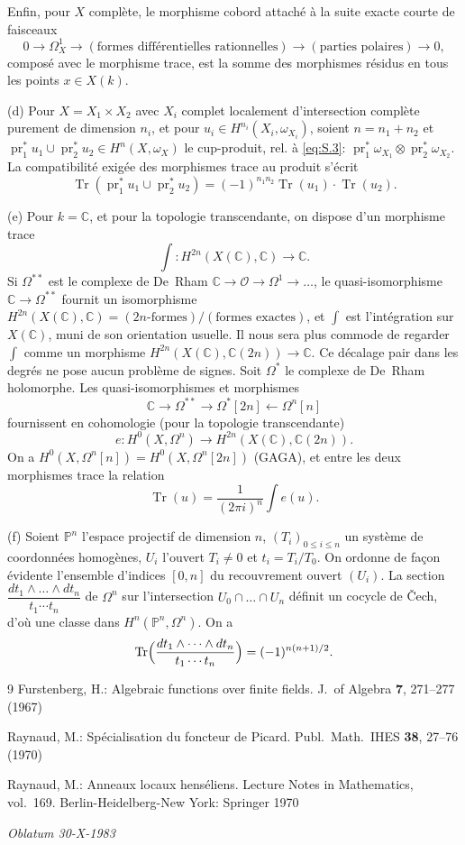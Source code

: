 \documentclass[12pt,a4paper]{article}
\theoremstyle{plain}
\theoremstyle{definition}
\theoremstyle{remark}
\DeclareMathOperator{\Tr}{Tr}
\newcommand{\CC}{\mathbb{C}}
\newcommand{\OO}{\mathcal{O}}
\newcommand{\PP}{\mathbb{P}}
\DeclareMathOperator{\pr}{pr}
\providecommand{\CC}{\mathbb{C}}
\providecommand{\PP}{\mathbb{P}}
\providecommand{\pr}{\operatorname{pr}}
\providecommand{\Tr}{\operatorname{Tr}}
\begin{document}
Enfin, pour $X$ complète, le morphisme cobord attaché à la suite exacte courte
de faisceaux
\[
0\to\Omega^1_X\to(\text{formes différentielles rationnelles})\to(\text{parties polaires})\to 0,
\]
composé avec le morphisme trace, est la somme des morphismes résidus en tous
les points $x\in X(k)$.

(d) Pour $X=X_1\times X_2$ avec $X_i$ complet localement d'intersection complète
purement de dimension $n_i$, et pour $u_i\in H^{n_i}(X_i,\omega_{X_i})$, soient
$n=n_1+n_2$ et $\pr_1^*u_1\cup\pr_2^*u_2\in H^n(X,\omega_X)$ le cup-produit, rel.
à \eqref{eq:S.3}:
$\pr_1^*\omega_{X_1}\otimes\pr_2^*\omega_{X_2}$. La compatibilité exigée des morphismes trace
au produit s'écrit
\[
\Tr(\pr_1^*u_1\cup\pr_2^*u_2)=(-1)^{n_1n_2}\Tr(u_1)\cdot\Tr(u_2).
\]

(e) Pour $k=\CC$, et pour la topologie transcendante, on dispose d'un morphisme
trace
\[
\textstyle\int:H^{2n}(X(\CC),\CC)\to\CC.
\]
Si $\Omega^{**}$ est le complexe de De~Rham $\CC\to\OO\to\Omega^1\to\dots$, le
quasi-isomorphisme $\CC\to\Omega^{**}$ fournit un isomorphisme
$H^{2n}(X(\CC),\CC)=(2n\text{-formes})/(\text{formes exactes})$, et $\int$ est
l'intégration sur $X(\CC)$, muni de son orientation usuelle. Il nous sera plus commode
de regarder $\int$ comme un morphisme $H^{2n}(X(\CC),\CC(2n))\to\CC$. Ce décalage
pair dans les degrés ne pose aucun problème de signes. Soit $\Omega^*$ le complexe de
De~Rham holomorphe. Les quasi-isomorphismes et morphismes
\[
\CC\to\Omega^{**}\to\Omega^*[2n]\leftarrow\Omega^n[n]
\]
fournissent en cohomologie (pour la topologie transcendante)
\[
e:H^0(X,\Omega^n)\to H^{2n}(X(\CC),\CC(2n)).
\]
On a $H^0(X,\Omega^n[n])=H^0(X,\Omega^n[2n])$ (GAGA), et entre les deux morphismes
trace la relation
\[
\Tr(u)=\frac{1}{(2\pi i)^n}\int e(u).
\]

(f) Soient $\PP^n$ l'espace projectif de dimension $n$, $(T_i)_{0\le i\le n}$ un système de
coordonnées homogènes, $U_i$ l'ouvert $T_i\neq 0$ et $t_i=T_i/T_0$. On ordonne de façon
évidente l'ensemble d'indices $[0,n]$ du recouvrement ouvert $(U_i)$. La section
$\dfrac{dt_1\wedge\dots\wedge dt_n}{t_1\dotsm t_n}$ de $\Omega^n$ sur l'intersection $U_0\cap\dots\cap U_n$ définit un cocycle de
\v{C}ech, d'où une classe dans $H^n(\PP^n,\Omega^n)$. On a
\[
\Tr\Bigl(\frac{dt_1\wedge\dots\wedge dt_n}{t_1\dotsm t_n}\Bigr)=(-1)^{n(n+1)/2}.
\]

\begin{thebibliography}{9}
Furstenberg, H.: Algebraic functions over finite fields. J.\ of Algebra
\textbf{7}, 271--277 (1967)

Raynaud, M.: Spécialisation du foncteur de Picard. Publ.\ Math.\ IHES
\textbf{38}, 27--76 (1970)

Raynaud, M.: Anneaux locaux henséliens. Lecture Notes in Mathematics,
vol.~169. Berlin-Heidelberg-New York: Springer 1970
\end{thebibliography}

\vspace{1cm}
\noindent\textit{Oblatum 30-X-1983}
\end{document}
